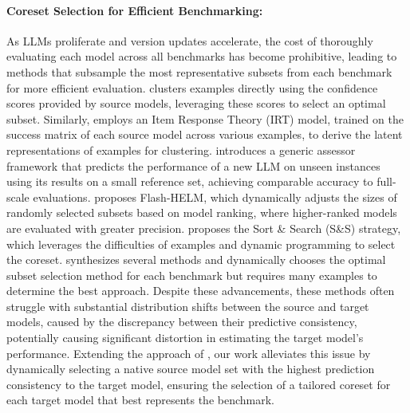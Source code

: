 \paragraph{Coreset Selection for Efficient Benchmarking:} As LLMs proliferate and version updates accelerate, the cost of thoroughly evaluating each model across all benchmarks has become prohibitive, leading to methods that subsample the most representative subsets from each benchmark for more efficient evaluation. \cite{AP} clusters examples directly using the confidence scores provided by source models, leveraging these scores to select an optimal subset. Similarly, \cite{tiny} employs an Item Response Theory (IRT) model, trained on the success matrix of each source model across various examples, to derive the latent representations of examples for clustering. \cite{100instances} introduces a generic assessor framework that predicts the performance of a new LLM on unseen instances using its results on a small reference set, achieving comparable accuracy to full-scale evaluations. \cite{perlitz2023efficient} proposes Flash-HELM, which dynamically adjusts the sizes of randomly selected subsets based on model ranking, where higher-ranked models are evaluated with greater precision. \cite{prabhu2024lifelong} proposes the Sort \& Search (S\&S) strategy, which leverages the difficulties of examples and dynamic programming to select the coreset. 
\cite{xu2024data} synthesizes several methods and dynamically chooses the optimal subset selection method for each benchmark but requires many examples to determine the best approach. Despite these advancements, these methods often struggle with substantial distribution shifts between the source and target models, caused by the discrepancy between their predictive consistency, potentially causing significant distortion in estimating the target model's performance. 
Extending the approach of \cite{AP}, our work alleviates this issue by dynamically selecting a native source model set with the highest prediction consistency to the target model, ensuring the selection of a tailored coreset for each target model that best represents the benchmark.

